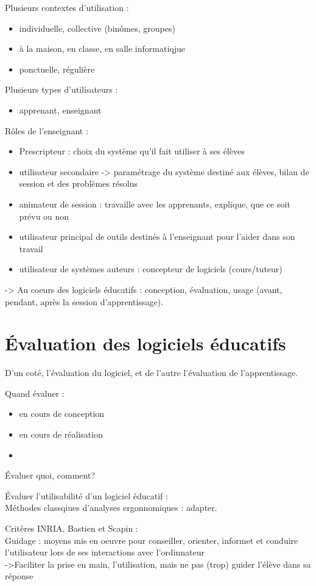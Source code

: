 \documentclass[11pt]{article}
\begin{document}
Plusieurs contextes d'utilisation :
\begin{itemize}
	\item individuelle, collective (binômes, groupes)
	\item à la maison, en classe, en salle informatiqjue
	\item ponctuelle, régulière
\end{itemize}

Plusieurs types d'utilisateurs :
\begin{itemize}
	\item apprenant, enseignant
\end{itemize}

\vskip 2cm
Rôles de l'enseignant :
\begin{itemize}
	\item Prescripteur : choix du système qu'il fait utiliser à ses élèves
	\item utilisateur secondaire -> paramétrage du système destiné aux élèves, bilan de session et des problèmes résolus
	\item animateur de session : travaille avec les apprenants, explique, que ce soit prévu ou non
	\item utilisateur principal de outils destinés à l'enseignant pour l'aider dans son travail
	\item utilisateur de systèmes auteurs : concepteur de logiciels (cours/tuteur)
\end{itemize}
-> Au coeurs des logiciels éducatifs : conception, évaluation, usage (avant, pendant, après la session d'apprentissage).

\section{Évaluation des logiciels éducatifs}
D'un coté, l'évaluation du logiciel, et de l'autre l'évaluation de l'apprentissage.

Quand évaluer :
\begin{itemize}
	\item en cours de conception
	\item en cours de réalisation
	\item 
\end{itemize}

Évaluer quoi, comment?

Évaluer l'utilisabilité d'un logiciel éducatif :\\
Méthodes classqiues d'analyses ergonnomiques : adapter.

Critères INRIA, Bastien et Scapin : \\
Guidage : moyens mis en oeuvre pour conseiller, orienter, informet et conduire l'utilisateur lors de ses interactions avec l'ordinnateur\\
->Faciliter la prise en main, l'utilisation, mais ne pas (trop) guider l'élève dans sa réponse
\end{document}
